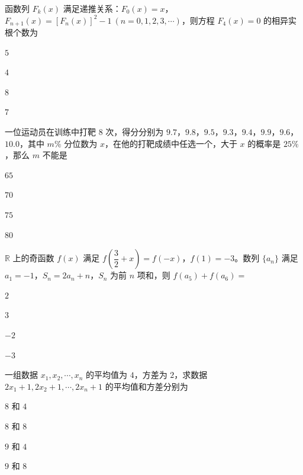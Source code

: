 \documentclass{exam-zh}
\begin{document}
\begin{question}
函数列 $F_k(x)$ 满足递推关系：$F_0(x)=x$，$F_{n+1}(x)=[F_n(x)]^2-1\ (n=0,1,2,3,\cdots)$，则方程 $F_4(x)=0$ 的相异实根个数为 \paren[]
\begin{choices}
  \item $5$
  \item $4$
  \item $8$
  \item $7$
\end{choices}
\end{question}

\begin{question}
一位运动员在训练中打靶 $8$ 次，得分分别为 $9.7$，$9.8$，$9.5$，$9.3$，$9.4$，$9.9$，$9.6$，$10.0$，其中 $m\%$ 分位数为 $x$，在他的打靶成绩中任选一个，大于 $x$ 的概率是 $25\%$，那么 $m$ 不能是 \paren[]
\begin{choices}
  \item $65$
  \item $70$
  \item $75$
  \item $80$
\end{choices}
\end{question}

\begin{question}
$\mathbb{R}$ 上的奇函数 $f(x)$ 满足 $f\left(\dfrac{3}{2}+x\right)=f(-x)$，$f(1)=-3$。数列 $\{a_n\}$ 满足 $a_1=-1$，$S_n=2a_n+n$，$S_n$ 为前 $n$ 项和，则 $f(a_5)+f(a_6)=$ \paren[]
\begin{choices}
  \item $2$
  \item $3$
  \item $-2$
  \item $-3$
\end{choices}
\end{question}

\begin{question}
一组数据 $x_1,x_2,\cdots,x_n$ 的平均值为 $4$，方差为 $2$，求数据 $2x_1+1,2x_2+1,\cdots,2x_n+1$ 的平均值和方差分别为 \paren[]
\begin{choices}
  \item $8$ 和 $4$
  \item $8$ 和 $8$
  \item $9$ 和 $4$
  \item $9$ 和 $8$
\end{choices}
\end{question}
\end{document}
